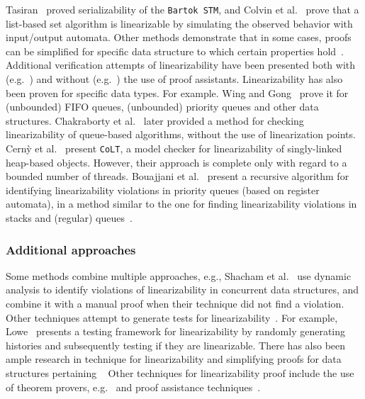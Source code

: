Tasiran~\cite{Ta08} proved serializability of the \texttt{Bartok STM}, and 
Colvin et 
al.~\cite{CoGrLuMo06} prove that a list-based set algorithm is linearizable by 
simulating the observed behavior with input/output automata.
%
%
Other methods demonstrate that in some cases, proofs can be simplified for specific data structure to which certain properties hold~\cite{BoEmEnMu17, FeEnMoRiSh18}.
%
Additional verification attempts of linearizability have been presented both 
with (e.g.~\cite{CoGrLuMo06}) and without (e.g.~\cite{DoGrLuMo04}) the use of 
proof assistants.
%
Linearizability has also been proven for specific data types. For example. 
Wing and Gong~\cite{WiGo93} prove it for  (unbounded) FIFO queues, (unbounded) 
priority queues and other data structures. Chakraborty et al.~\cite{ChHeSeVa15} 
later provided a method for checking linearizability of queue-based algorithms, 
without the use of linearization points. Cern{\`y} et al.~\cite{CeRaZuChAl10} 
present \texttt{CoLT}, a model checker for linearizability of singly-linked 
heap-based 
objects. However, their approach is complete only with regard to a bounded 
number of threads. 
%
Bouajjani et al.~\cite{BoEnWa17} present a recursive algorithm for identifying 
linearizability violations in priority queues (based on register automata), in 
a method similar to the one for finding linearizability violations in stacks 
and (regular) queues~\cite{BoEmEnHa18}.
%


\subsubsection{Additional approaches}

%
Some methods combine multiple approaches, e.g., Shacham et 
al.~\cite{ShBrAiSaVeYa11} use dynamic analysis to identify 
violations of linearizability in concurrent data structures, and combine it 
with a manual proof when their technique did not find a violation.
%
Other techniques attempt to generate tests for linearizability~\cite{WiGo93, 
PrGr12, PrGr13, EmEn17}. For example, 
Lowe~\cite{Lo17} presents a testing framework for linearizability by randomly 
generating histories and subsequently testing if they are 
linearizable.
%
There has also been ample research in technique for linearizability  and simplifying proofs for data structures pertaining ~\cite{BoEmEnMu17, FeEnMoRiSh18, EnKo24} 
%
Other techniques for linearizability proof include the use of theorem provers, 
e.g.~\cite{CoDoGr05, DeScWe11} and proof assistance techniques~\cite{EnKo24}.
%
%

